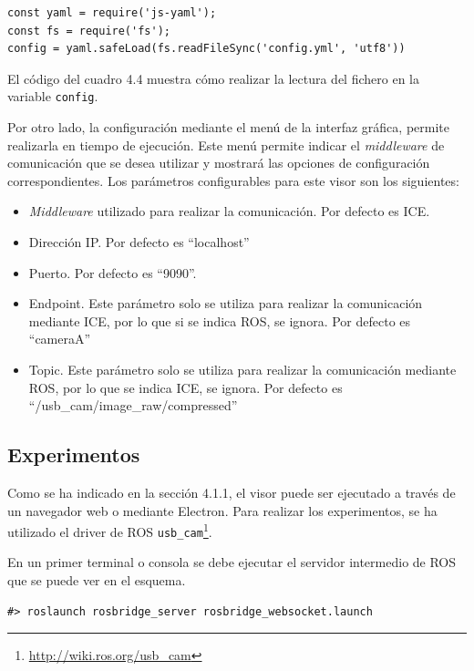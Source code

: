 \begin{lstlisting}[caption = Leer el fichero ``YAML'' con la configuración y guardar la información en una variable, label = cod.yaml]
const yaml = require('js-yaml');
const fs = require('fs');
config = yaml.safeLoad(fs.readFileSync('config.yml', 'utf8'))
\end{lstlisting}

El código del cuadro 4.4 muestra cómo realizar la lectura del fichero en la variable \texttt{config}.

Por otro lado, la configuración mediante el menú de la interfaz gráfica, permite realizarla en tiempo de ejecución. Este menú permite indicar el \textit{middleware} de comunicación que se desea utilizar y mostrará las opciones de configuración correspondientes. Los parámetros configurables para este visor son los siguientes:
\begin{itemize}
\item \textit{Middleware} utilizado para realizar la comunicación. Por defecto es ICE.
\item Dirección IP. Por defecto es ``localhost''
\item Puerto. Por defecto es ``9090''.
\item Endpoint. Este parámetro solo se utiliza para realizar la comunicación mediante ICE, por lo que si se indica ROS, se ignora. Por defecto es ``cameraA''
\item Topic. Este parámetro solo se utiliza para realizar la comunicación mediante ROS, por lo que se indica ICE, se ignora. Por defecto es ``/usb\_cam/image\_raw/compressed''
\end{itemize}

\subsection{Experimentos}
Como se ha indicado en la sección 4.1.1, el visor puede ser ejecutado a través de un navegador web o mediante Electron. Para realizar los experimentos, se ha utilizado el driver de ROS \texttt{usb\_cam}\footnote{\url{http://wiki.ros.org/usb_cam}}.

En un primer terminal o consola se debe ejecutar el servidor intermedio de ROS que se puede ver en el esquema.

\begin{lstlisting}[caption= Ejecución del servidor intermedio, label=cod.servidorintermediocamviz]
#> roslaunch rosbridge_server rosbridge_websocket.launch
\end{lstlisting}

